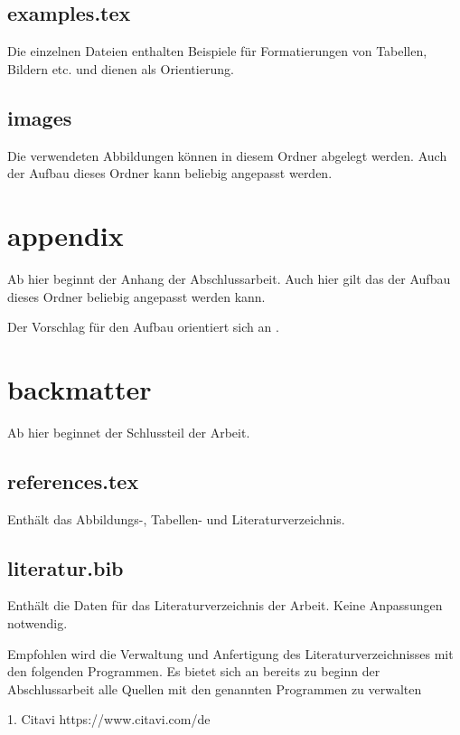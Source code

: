 \subsection*{examples.tex}

Die einzelnen Dateien enthalten Beispiele für Formatierungen von Tabellen, Bildern etc. und dienen als Orientierung.

\subsection*{images}

Die verwendeten Abbildungen können in diesem Ordner abgelegt werden. Auch der Aufbau dieses Ordner kann beliebig angepasst werden.

\section*{appendix}

Ab hier beginnt der Anhang der Abschlussarbeit. Auch hier gilt das der Aufbau dieses Ordner beliebig angepasst werden kann.

Der Vorschlag für den Aufbau orientiert sich an .

\section*{backmatter}

Ab hier beginnet der Schlussteil der Arbeit.

\subsection*{references.tex}

Enthält das Abbildungs-, Tabellen- und Literaturverzeichnis. 

\subsection*{literatur.bib}

Enthält die Daten für das Literaturverzeichnis der Arbeit. Keine Anpassungen notwendig.

Empfohlen wird die Verwaltung und Anfertigung des Literaturverzeichnisses mit den folgenden Programmen. Es bietet sich an bereits zu beginn der Abschlussarbeit alle Quellen mit den genannten Programmen zu verwalten

1. Citavi https://www.citavi.com/de

